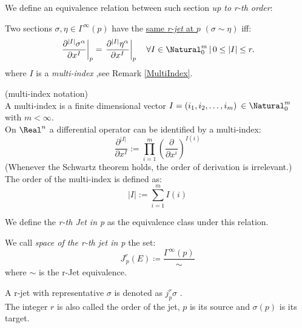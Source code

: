 \documentclass[Main]{subfiles}
\begin{document}
			We define an equivalence relation between such section \emph{up to r-th order}:
			\begin{definition}
				Two sections $\sigma, \eta \in \Gamma^\infty(p)$ have the \underline{same \emph{r-jet} at $p$} $(\sigma \sim \eta)$ iff:
				\begin{displaymath}
					\left.\frac{\partial^{|I|} \sigma^{\alpha}}{\partial x^{I}}\right|_{p} = \left.\frac{\partial^{|I|} \eta^{\alpha}}{\partial x^{I}}\right|_{p} \quad \forall I\in \Natural^m_0 \, \vert \, 0 \leq |I| \leq r.
				\end{displaymath}
				where $I$ is a \emph{multi-index} ,see Remark \ref{MultiIndex}.
		\end{definition}
		\begin{remark}\label{MultiIndex}
			(multi-index notation)
			\\
			A multi-index is a %
			finite dimensional vector  $I=(i_1, i_2, \ldots, i_m)\: \in \Natural^m_0$ with $m<\infty$.
			\\
			On $\Real^n$ a differential operator can be identified by a multi-index:
			\begin{displaymath}
				\frac{\partial^{|I|}}{\partial x^{I}} := \prod_{i=1}^{m} \left( \frac{\partial}{\partial x^{i}} \right)^{I(i)}
			\end{displaymath}
			(Whenever the Schwartz theorem holds, the order of derivation is irrelevant.)
			\\
			The order of the multi-index is defined as:
			\begin{displaymath}
				|I| := \sum_{i=1}^{m} I(i)
			\end{displaymath}
		\end{remark}

		We define the \emph{r-th Jet in p} as the equivalence class under this relation.
		\begin{definition}
			We call \emph{space of the r-th jet in p} the set:
			\begin{displaymath}
				J^r_{\,p}(E) \coloneqq \frac{\Gamma^\infty(p)}{\sim}
			\end{displaymath}
			where $\sim$ is the r-Jet equivalence.
		\end{definition}
		\begin{notationfix}
			A r-jet with representative $\sigma$ is denoted as $j^r_p\sigma$ .
			\\
			The integer $r$ is also called the order of the jet, $p$ is its source and $\sigma(p)$ is its target.
		\end{notationfix}
\end{document}
